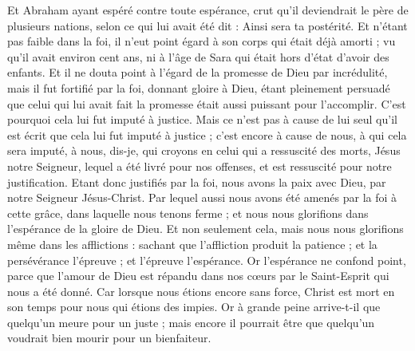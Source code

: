 \begin{multicols}{2}
Et Abraham ayant espéré contre toute espérance, crut qu'il deviendrait le père de plusieurs nations, selon ce qui lui avait été dit : Ainsi sera ta postérité.
Et n’étant pas faible dans la foi, il n’eut point égard à son corps qui était déjà amorti ; vu qu’il avait environ cent ans, ni à l’âge de Sara qui était hors d’état d’avoir des enfants.
Et il ne douta point à l’égard de la promesse de Dieu par incrédulité, mais il fut fortifié par la foi, donnant gloire à Dieu,
étant pleinement persuadé que celui qui lui avait fait la promesse était aussi puissant pour l'accomplir.
C'est pourquoi cela lui fut imputé à justice.
Mais ce n’est pas à cause de lui seul qu’il est écrit que cela lui fut imputé à justice ;
c’est encore à cause de nous, à qui cela sera imputé, à nous, dis-je, qui croyons en celui qui a ressuscité des morts, Jésus notre Seigneur,
lequel a été livré pour nos offenses, et est ressuscité pour notre justification.
\VerseOne{}Etant donc justifiés par la foi, nous avons la paix avec Dieu, par notre Seigneur Jésus-Christ.
Par lequel aussi nous avons été amenés par la foi à cette grâce, dans laquelle nous tenons ferme ; et nous nous glorifions dans l'espérance de la gloire de Dieu.
Et non seulement cela, mais nous nous glorifions même dans les afflictions : sachant que l’affliction produit la patience ;
et la persévérance l'épreuve ; et l'épreuve l'espérance.
Or l'espérance ne confond point, parce que l'amour de Dieu est répandu dans nos cœurs par le Saint-Esprit qui nous a été donné.
Car lorsque nous étions encore sans force, Christ est mort en son temps pour nous qui étions des impies.
Or à grande peine arrive-t-il que quelqu’un meure pour un juste ; mais encore il pourrait être que quelqu’un voudrait bien mourir pour un bienfaiteur.

\end{multicols}
